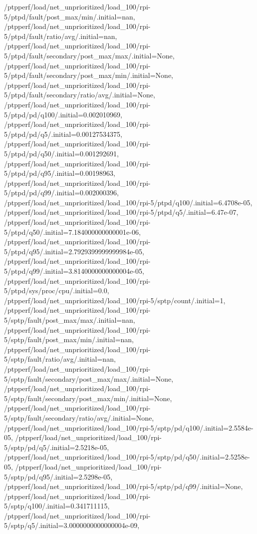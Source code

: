 {    /ptpperf/load/net_unprioritized/load_100/rpi-5/ptpd/fault/post_max/min/.initial=nan,
    /ptpperf/load/net_unprioritized/load_100/rpi-5/ptpd/fault/ratio/avg/.initial=nan,
    /ptpperf/load/net_unprioritized/load_100/rpi-5/ptpd/fault/secondary/post_max/max/.initial=None,
    /ptpperf/load/net_unprioritized/load_100/rpi-5/ptpd/fault/secondary/post_max/min/.initial=None,
    /ptpperf/load/net_unprioritized/load_100/rpi-5/ptpd/fault/secondary/ratio/avg/.initial=None,
    /ptpperf/load/net_unprioritized/load_100/rpi-5/ptpd/pd/q100/.initial=0.002010969,
    /ptpperf/load/net_unprioritized/load_100/rpi-5/ptpd/pd/q5/.initial=0.00127534375,
    /ptpperf/load/net_unprioritized/load_100/rpi-5/ptpd/pd/q50/.initial=0.001292691,
    /ptpperf/load/net_unprioritized/load_100/rpi-5/ptpd/pd/q95/.initial=0.00198963,
    /ptpperf/load/net_unprioritized/load_100/rpi-5/ptpd/pd/q99/.initial=0.002000396,
    /ptpperf/load/net_unprioritized/load_100/rpi-5/ptpd/q100/.initial=6.4708e-05,
    /ptpperf/load/net_unprioritized/load_100/rpi-5/ptpd/q5/.initial=6.47e-07,
    /ptpperf/load/net_unprioritized/load_100/rpi-5/ptpd/q50/.initial=7.184000000000001e-06,
    /ptpperf/load/net_unprioritized/load_100/rpi-5/ptpd/q95/.initial=2.7929399999999984e-05,
    /ptpperf/load/net_unprioritized/load_100/rpi-5/ptpd/q99/.initial=3.8140000000000004e-05,
    /ptpperf/load/net_unprioritized/load_100/rpi-5/ptpd/sys/proc/cpu/.initial=0.0,
    /ptpperf/load/net_unprioritized/load_100/rpi-5/sptp/count/.initial=1,
    /ptpperf/load/net_unprioritized/load_100/rpi-5/sptp/fault/post_max/max/.initial=nan,
    /ptpperf/load/net_unprioritized/load_100/rpi-5/sptp/fault/post_max/min/.initial=nan,
    /ptpperf/load/net_unprioritized/load_100/rpi-5/sptp/fault/ratio/avg/.initial=nan,
    /ptpperf/load/net_unprioritized/load_100/rpi-5/sptp/fault/secondary/post_max/max/.initial=None,
    /ptpperf/load/net_unprioritized/load_100/rpi-5/sptp/fault/secondary/post_max/min/.initial=None,
    /ptpperf/load/net_unprioritized/load_100/rpi-5/sptp/fault/secondary/ratio/avg/.initial=None,
    /ptpperf/load/net_unprioritized/load_100/rpi-5/sptp/pd/q100/.initial=2.5584e-05,
    /ptpperf/load/net_unprioritized/load_100/rpi-5/sptp/pd/q5/.initial=2.5218e-05,
    /ptpperf/load/net_unprioritized/load_100/rpi-5/sptp/pd/q50/.initial=2.5258e-05,
    /ptpperf/load/net_unprioritized/load_100/rpi-5/sptp/pd/q95/.initial=2.5298e-05,
    /ptpperf/load/net_unprioritized/load_100/rpi-5/sptp/pd/q99/.initial=None,
    /ptpperf/load/net_unprioritized/load_100/rpi-5/sptp/q100/.initial=0.341711115,
    /ptpperf/load/net_unprioritized/load_100/rpi-5/sptp/q5/.initial=3.0000000000000004e-09,
}
